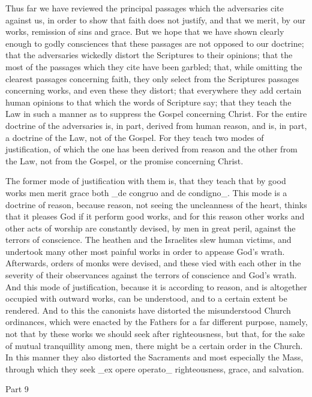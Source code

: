 Thus far we have reviewed the principal passages which the
adversaries cite against us, in order to show that faith does not
justify, and that we merit, by our works, remission of sins and grace.
But we hope that we have shown clearly enough to godly consciences
that these passages are not opposed to our doctrine; that the
adversaries wickedly distort the Scriptures to their opinions; that
the most of the passages which they cite have been garbled; that,
while omitting the clearest passages concerning faith, they only
select from the Scriptures passages concerning works, and even these
they distort; that everywhere they add certain human opinions to that
which the words of Scripture say; that they teach the Law in such a
manner as to suppress the Gospel concerning Christ.  For the entire
doctrine of the adversaries is, in part, derived from human reason,
and is, in part, a doctrine of the Law, not of the Gospel.  For they
teach two modes of justification, of which the one has been derived
from reason and the other from the Law, not from the Gospel, or the
promise concerning Christ.

The former mode of justification with them is, that they teach that
by good works men merit grace both _de congruo and de condigno_.
This mode is a doctrine of reason, because reason, not seeing the
uncleanness of the heart, thinks that it pleases God if it perform
good works, and for this reason other works and other acts of worship
are constantly devised, by men in great peril, against the terrors of
conscience.  The heathen and the Israelites slew human victims, and
undertook many other most painful works in order to appease God's
wrath.  Afterwards, orders of monks were devised, and these vied with
each other in the severity of their observances against the terrors
of conscience and God's wrath.  And this mode of justification,
because it is according to reason, and is altogether occupied with
outward works, can be understood, and to a certain extent be rendered.
And to this the canonists have distorted the misunderstood Church
ordinances, which were enacted by the Fathers for a far different
purpose, namely, not that by these works we should seek after
righteousness, but that, for the sake of mutual tranquillity among
men, there might be a certain order in the Church.  In this manner
they also distorted the Sacraments and most especially the Mass,
through which they seek _ex opere operato_ righteousness, grace, and
salvation.




Part 9


